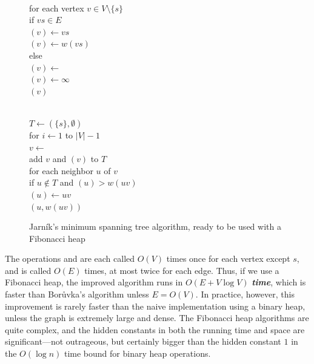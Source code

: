 \begin{figure}[ht]
\centering
\begin{minipage}[c]{0.40\linewidth}
\begin{pseudocode}
\\
for each vertex $v \in V\setminus  \{s\}$\\
\Indent if $vs \in E$\\
\Indent\Indent {}$(v) \gets vs$\\
\Indent\Indent {}$(v) \gets w(vs)$\\
\Indent else\\
\Indent\Indent {}$(v) \gets$  \\
\Indent\Indent {}$(v) \gets \infty$\\
\Indent {}$(v)$
\end{pseudocode}
\end{minipage}\hfill
\begin{minipage}[c]{0.57\linewidth}
\begin{pseudocode}
\\
$T\gets (\{s\},\emptyset )$\\
for $i \gets 1$ to $|V| -1$\\
\Indent $v \gets$  \\
\Indent add $v$ and $(v)$ to $T$\\
\Indent for each neighbor $u$ of $v$\\
\Indent\Indent if $u\notin T$ and $(u) > w(uv)$\\
\Indent\Indent\Indent {}$(u) \gets uv$\\
\Indent\Indent\Indent {}$(u, w(uv))$
\end{pseudocode}
\end{minipage}
\caption{Jarník’s minimum spanning tree algorithm, ready to be used with a Fibonacci heap}
\label{fig:7.5}
\end{figure}

The operations  and  are each called $O(V)$ times once for each vertex except $s$, and  is called $O(E)$ times, at most twice for each edge. Thus, if we use a Fibonacci heap, the improved algorithm runs in $O(E + V \log  V)$ \textbf{\textit{time}}, which is faster than Borůvka’s algorithm unless $E = O(V)$. In practice, however, this improvement is rarely faster than the naive implementation using a binary heap, unless the graph is extremely large and dense. The Fibonacci heap algorithms are quite complex, and the hidden constants in both the running time and space are significant—not outrageous, but certainly bigger than the hidden constant $1$ in the $O(\log  n)$ time bound for binary heap operations.

